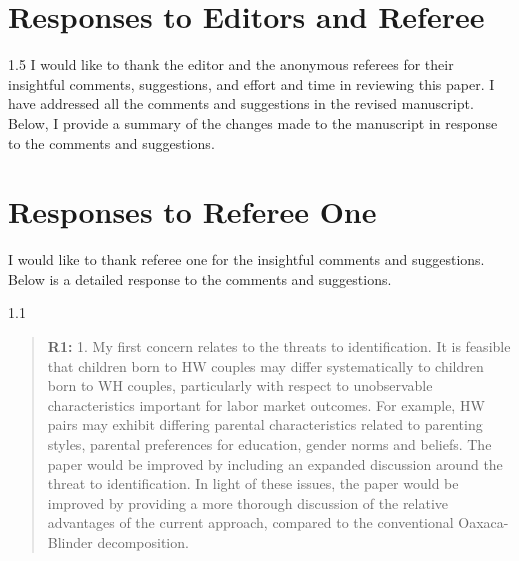 \documentclass[12pt,english]{article}
\newcommand{\rrquote}{1.1}
\newcommand{\rrxspc}{1.5}
\begin{document}
\begin{refsection}
\setcounter{section}{0}
\renewcommand{\thesection}{\Alph{section}}
\renewcommand{\thesubsection}{\Alph{section}.\arabic{subsection}}
\renewcommand{\thesubsubsection}{\Alph{section}.\arabic{subsection}.\arabic{subsubsection}}

        \section{Responses to Editors and Referee} \label{r&r:responses}
        \begin{spacing}{\rrxspc}
            I would like to thank the editor and the anonymous referees for their insightful comments, suggestions, and effort and time in reviewing this paper. I have addressed all the comments and suggestions in the revised manuscript. Below, I provide a summary of the changes made to the manuscript in response to the comments and suggestions.
        \end{spacing}

    \newpage
    
    \section{Responses to Referee One}
        I would like to thank referee one for the insightful comments and suggestions. Below is a detailed response to the comments and suggestions.
    \begin{spacing}{\rrquote}
    \begin{quotation}
    \textbf{R1: } 1. My first concern relates to the threats to identification. It is feasible that children born to HW couples may differ systematically to children born to WH couples, particularly with respect to unobservable characteristics important for labor market outcomes. For example, HW pairs may exhibit differing parental characteristics related to parenting styles, parental preferences for education, gender norms and beliefs. The paper would be improved by including an expanded discussion around the threat to identification. In light of these issues, the paper would be improved by providing a more thorough discussion of the relative advantages of the current approach, compared to the conventional Oaxaca-Blinder decomposition.
    \end{quotation}
    \end{spacing}
    

\end{refsection}
\end{document}

